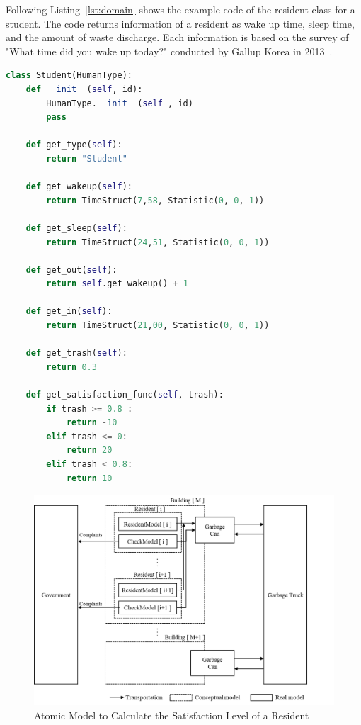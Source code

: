 \documentclass{scsSimAUDPaperFormat}
\begin{document}
Following Listing~\ref{lst:domain} shows the example code of the resident class for a student. The code returns information of a resident as wake up time, sleep time,  and the amount of waste discharge. Each information is based on the survey of "What time did you wake up today?" conducted by Gallup Korea in 2013~\cite{gallup2013}. 

\begin{lstlisting}[language=Python, caption=Example Code of Resident for Student, label={lst:domain}]
class Student(HumanType):
    def __init__(self,_id):
        HumanType.__init__(self ,_id)
        pass
    
    def get_type(self):
        return "Student"

    def get_wakeup(self):
        return TimeStruct(7,58, Statistic(0, 0, 1))
        
    def get_sleep(self):
        return TimeStruct(24,51, Statistic(0, 0, 1))
  
    def get_out(self):
        return self.get_wakeup() + 1

    def get_in(self):
        return TimeStruct(21,00, Statistic(0, 0, 1))

    def get_trash(self):
        return 0.3        

    def get_satisfaction_func(self, trash):
        if trash >= 0.8 :
            return -10
        elif trash <= 0:
            return 20
        elif trash < 0.8:
            return 10
\end{lstlisting}

\begin{figure}[ht]
    \centering
    \includegraphics[width=1.5\columnwidth]{fig/framework_revised}
    \caption{Atomic Model to Calculate the Satisfaction Level of a Resident}
    \label{Fig:Framework}
\end{figure}
\end{document}
